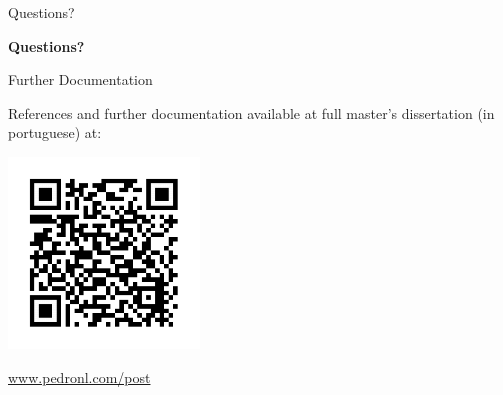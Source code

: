 \documentclass[12pt,ignorenonframetext,]{beamer}
\begin{document}
\begin{frame}{Questions?}
\protect\hypertarget{questions}{}

\textbf{Questions?}

\end{frame}

\begin{frame}{Further Documentation}
\protect\hypertarget{further-documentation}{}

References and further documentation available at full master's
dissertation (in portuguese) at:

\centerline{\includegraphics[height=2in]{images/qr-code-materials.png}}

\href{https://www.pedronl.com/post/3d-printing-rdm-analysis-2018-dmdu-meet}{www.pedronl.com/post}

\end{frame}
\end{document}
